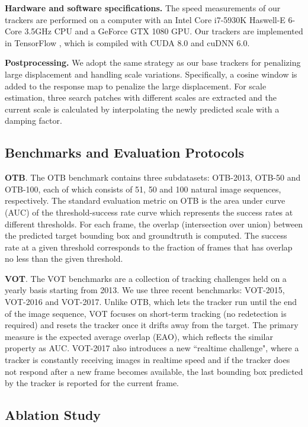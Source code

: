 \documentclass[journal]{IEEEtran}
\begin{document}
\textbf{Hardware and software specifications.} The speed measurements of our trackers are performed on a computer with an Intel Core i7-5930K Haswell-E 6-Core 3.5GHz CPU and a GeForce GTX 1080 GPU. Our trackers are implemented in TensorFlow \cite{tensorflow2015-whitepaper}, which is compiled with CUDA 8.0 and cuDNN 6.0. 

\textbf{Postprocessing.} We adopt the same strategy as our base trackers for penalizing large displacement and handling scale variations. Specifically, a cosine window is added to the response map to penalize the large displacement. For scale estimation, three search patches with different scales are extracted and the current scale is calculated by interpolating the newly predicted scale with a damping factor.

\subsection{Benchmarks and Evaluation Protocols}
\textbf{OTB}. The OTB benchmark contains three subdatasets: OTB-2013, OTB-50 and OTB-100, each of which consists of 51, 50 and 100 natural image sequences, respectively. The standard evaluation metric on OTB is the area under curve (AUC) of the threshold-success rate curve which represents the success rates at different thresholds. For each frame, the overlap (intersection over union) between the predicted target bounding box and groundtruth is computed. The success rate at a given threshold corresponds to the fraction of frames that has overlap no less than the given threshold. 

\textbf{VOT}. The VOT benchmarks are a collection of tracking challenges held on a yearly basis starting from 2013. We use three recent benchmarks: VOT-2015, VOT-2016 and VOT-2017. Unlike OTB, which lets the tracker run until the end of the image sequence, VOT focuses on short-term tracking (no redetection is required) and resets the tracker once it drifts away from the target. The primary measure is the expected average overlap (EAO), which reflects the similar property as AUC. VOT-2017 also introduces a new ``realtime challenge", where a tracker is constantly receiving images in realtime speed and if the tracker does not respond after a new frame becomes available, the last bounding box predicted by the tracker is reported for the current frame. 

\subsection{Ablation Study}
\end{document}
